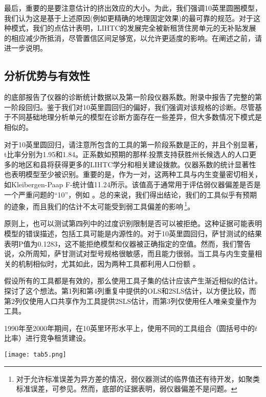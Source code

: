 \documentclass[lang=cn,11pt,a4paper]{paper}
\begin{document}
最后，重要的是要注意估计的挤出效应的大小。为此，我们强调10英里圆圈模型，我们认为这是基于上述原因(例如更精确的地理固定效果)的最可靠的规范。对于这种模式，我们的点估计表明，LIHTC的发展完全被新租赁住房单元的无补贴发展的相应减少所抵消，尽管置信区间足够宽，以允许更适度的影响。在阐述之前，请进一步说明。

\subsection{分析优势与有效性}

的底部报告了仪器的诊断统计数据以及第一阶段仪器系数。附录中报告了完整的第一阶段回归。鉴于我们对10英里圆回归的偏好，我们强调对该规格的诊断。尽管基于不同基础地理分析单元的模型在诊断方面存在一些差异，但大多数情况下模式是相似的。

对于10英里圆回归，请注意所包含的工具的第一阶段系数是正的，并且个别显著，t比率分别为1.95和1.84。正系数如预期的那样:投票支持获胜州长候选人的人口更多的地区和县将获得更多的LIHTC学分和相关建设拨款。仪器系数的统计显著性也表明模型至少被识别。重要的是，作为一对，这两种工具与内生变量密切相关，如Kleibergen-Paap F-统计值11.24所示。该值高于通常用于评估弱仪器偏差是否是一个严重问题的“10”，例如 \cite{Stock200580}。总的来说，我们得出结论，我们的工具似乎有预期的迹象，而且我们的估计不太可能受到弱工具偏差的影响\,\footnote{对于允许标准误差为异方差的情况，弱仪器测试的临界值还有待开发，如聚类标准误差，可参见\cite{Stock200580}。然而，底部的证据表明，弱仪器偏差不是问题。}。

原则上，也可以测试第四列中的过度识别限制是否可以被拒绝。这种证据可能表明模型的错误描述，包括工具可能是内源性的。对于10英里圆回归，萨甘测试的结果表明P值为0.1283，这不能拒绝模型和仪器被正确指定的空值。然而，我们警告说，众所周知，萨甘测试对型号规格很敏感，而且能力很弱。当工具与内生变量相关的机制相似时，尤其如此，因为两种工具都利用人口份额 \citep{Cameron2006,Murray2006111}。

假设所有的工具都是有效的，那么使用工具子集的估计应该产生渐近相似的估计。探讨了这个想法。第1列和第4列重复中提供的OLS和2SLS估计，以方便比较，而第2列仅使用人口共享作为工具提供2SLS估计，而第3列仅使用任人唯亲变量作为工具。

\begin{table}[h]
  \caption{1990年至2000年期间，在10英里环形水平上，使用不同的工具组合（圆括号中的$t$比率）进行竞争租赁建设。}\label{tab5}
  \texttt{[image: tab5.png]}
\noindent{}
\end{table}
\end{document}

